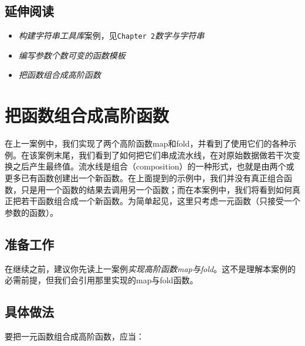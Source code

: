 \subsection{延伸阅读}



\begin{itemize}
\item \textit{构建字符串工具库}案例，见\texttt{Chapter 2}\textit{数字与字符串}



\item \textit{编写参数个数可变的函数模板}



\item \textit{把函数组合成高阶函数}

\end{itemize}



\section{把函数组合成高阶函数}



在上一案例中，我们实现了两个高阶函数map和fold，并看到了使用它们的各种示例。在该案例末尾，我们看到了如何把它们串成流水线，在对原始数据做若干次变换之后产生最终值。流水线是组合（composition）的一种形式，也就是由两个或更多已有函数创建出一个新函数。在上面提到的示例中，我们并没有真正组合函数，只是用一个函数的结果去调用另一个函数；而在本案例中，我们将看到如何真正把若干函数组合成一个新函数。为简单起见，这里只考虑一元函数（只接受一个参数的函数）。



\subsection{准备工作}



在继续之前，建议你先读上一案例\textit{实现高阶函数map与fold}。这不是理解本案例的必需前提，但我们会引用那里实现的map与fold函数。



\subsection{具体做法}



要把一元函数组合成高阶函数，应当：


